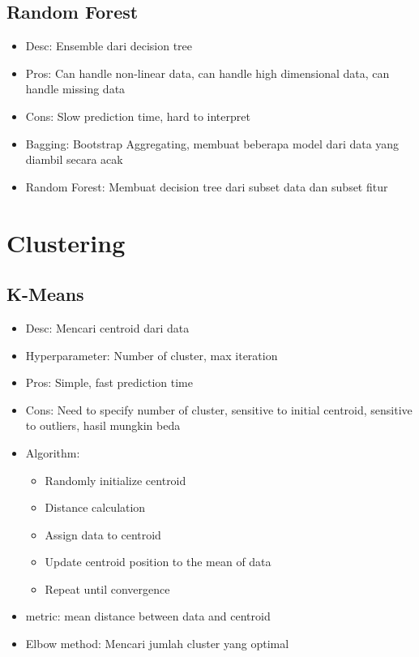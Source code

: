 \documentclass[conference]{IEEEtran}
\begin{document}
\subsection{Random Forest}

\begin{itemize}
    \item Desc: Ensemble dari decision tree
    \item Pros: Can handle non-linear data, can handle high dimensional data, can handle missing data
    \item Cons: Slow prediction time, hard to interpret
    \item Bagging: Bootstrap Aggregating, membuat beberapa model dari data yang diambil secara acak
    \item Random Forest: Membuat decision tree dari subset data dan subset fitur
\end{itemize}

\section{Clustering}

\subsection{K-Means}

\begin{itemize}
    \item Desc: Mencari centroid dari data
    \item Hyperparameter: Number of cluster, max iteration
    \item Pros: Simple, fast prediction time
    \item Cons: Need to specify number of cluster, sensitive to initial centroid, sensitive to outliers, hasil mungkin beda
    \item Algorithm: 
    \begin{itemize}
        \item Randomly initialize centroid
        \item Distance calculation
        \item Assign data to centroid
        \item Update centroid position to the mean of data
        \item Repeat until convergence
    \end{itemize}
    \item metric: mean distance between data and centroid
    \item Elbow method: Mencari jumlah cluster yang optimal
\end{itemize}
\end{document}
